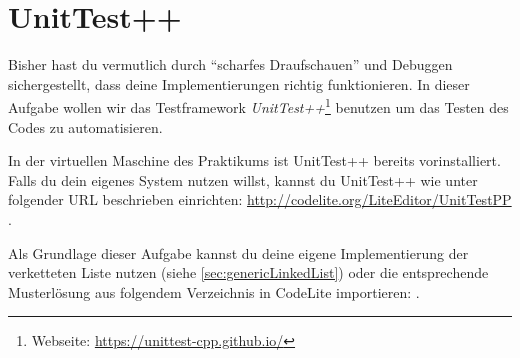 \section{\ExercisePrefixAdvanced UnitTest++ \optional}\label{sec:unit_test}
\optionaltextbox
{}

Bisher hast du vermutlich durch \enquote{scharfes Draufschauen} und Debuggen sichergestellt, dass deine Implementierungen richtig funktionieren.
In dieser Aufgabe wollen wir das Testframework \emph{UnitTest++}\footnote{Webseite: \url{https://unittest-cpp.github.io/}} benutzen um das Testen des Codes zu automatisieren.

In der virtuellen Maschine des Praktikums ist UnitTest++ bereits vorinstalliert.
Falls du dein eigenes System nutzen willst, kannst du UnitTest++ wie unter folgender URL beschrieben einrichten: \url{http://codelite.org/LiteEditor/UnitTestPP } .

Als Grundlage dieser Aufgabe kannst du deine eigene Implementierung der verketteten Liste nutzen (siehe \ref{sec:genericLinkedList}) oder die entsprechende Musterlösung aus folgendem Verzeichnis in CodeLite importieren: .

